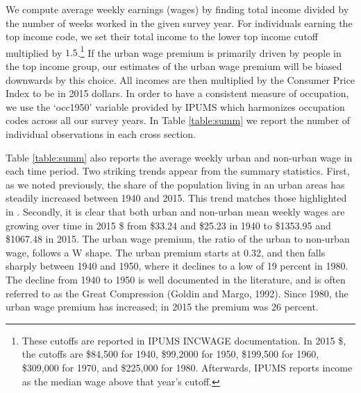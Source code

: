 \documentclass[12pt,twoside]{article}
\begin{document}
We compute average weekly earnings (wages) by finding total income divided by the number of weeks worked in the given survey year. 
For individuals earning the top income code, we set their total income to the lower top income cutoff multiplied by $1.5$.\footnote{These cutoffs are reported in IPUMS INCWAGE documentation. 
In 2015 \$, the cutoffs are \$84,500 for 1940, \$99,2000 for 1950, \$199,500 for 1960, \$309,000 for 1970, and \$225,000 for 1980. Afterwards, IPUMS reports income as the median wage above that year's cutoff.} 
If the urban wage premium is primarily driven by people in the top income group, our estimates of the urban wage premium will be biased downwards by this choice. 
All incomes are then multiplied by the Consumer Price Index to be in 2015 dollars. 
In order to have a consistent measure of occupation, we use the `occ1950' variable provided by IPUMS which harmonizes occupation codes across all our survey years.
In Table \ref{table:summ} we report the number of individual observations in each cross section.

Table \ref{table:summ} also reports the average weekly urban and non-urban wage in each time period. 
Two striking trends appear from the summary statistics.
First, as we noted previously, the share of the population living in an urban areas has steadily increased between 1940 and 2015. 
This trend matches those highlighted in \citet{Boustan_Bunten_Hearey_2013}. 
Secondly, it is clear that both urban and non-urban mean weekly wages are growing over time in 2015 \$ from \$33.24 and \$25.23 in 1940 to \$1353.95 and \$1067.48 in 2015.
The urban wage premium, the ratio of the urban to non-urban wage, follows a W shape. 
The urban premium starts at 0.32, and then falls sharply between 1940 and 1950, where it declines to a low of 19 percent in 1980. 
The decline from 1940 to 1950 is well documented in the literature, and is often referred to as the Great Compression (Goldin and Margo, 1992). 
Since 1980, the urban wage premium has increased; in 2015 the premium was 26 percent.
\end{document}
